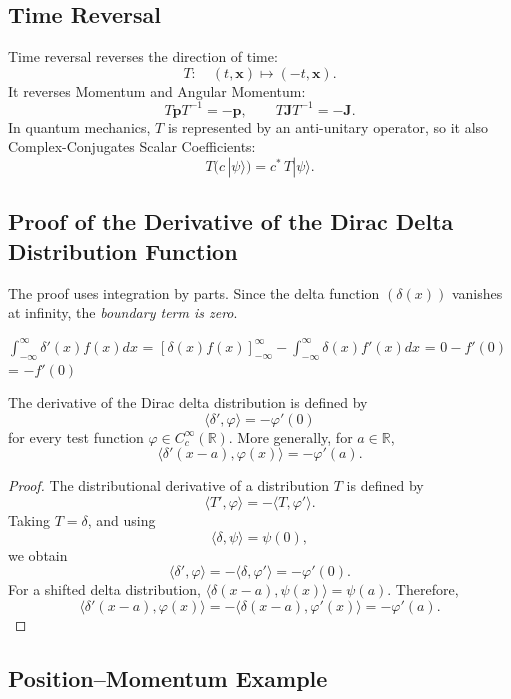 \documentclass[a4paper, 10pt, onepage]{elegantbook}
\begin{document}
{\subsection{Time Reversal}

Time reversal reverses the direction of time:
\[
T:\quad (t,\mathbf{x})\longmapsto(-t,\mathbf{x}).
\]
It reverses Momentum and Angular Momentum:
\[
T\mathbf{p}T^{-1}=-\mathbf{p},
\qquad
T\mathbf{J}T^{-1}=-\mathbf{J}.
\]
In quantum mechanics, \(T\) is represented by an anti-unitary operator, so it also Complex-Conjugates Scalar 
Coefficients:
\[
T\bigl(c\,|\psi\rangle\bigr)
=c^*\,T|\psi\rangle.
\]

\subsection{Proof of the Derivative of the Dirac Delta Distribution Function}

The proof uses integration by parts. Since the delta function $(\delta(x))$ vanishes at infinity, 
the \emph{boundary term is zero}.  

$\int_{-\infty}^{\infty} \delta'(x) f(x) dx$ = $\left[ \delta(x) f(x) \right]_{-\infty}^{\infty} 
- \int_{-\infty}^{\infty} \delta(x) f'(x) dx$ = $0 - f'(0)$ = $-f'(0)$  

\begin{theorem}
The derivative of the Dirac delta distribution is defined by
\[
\langle \delta',\varphi\rangle=-\varphi'(0)
\]
for every test function \(\varphi\in C_c^\infty(\mathbb{R})\).
More generally, for \(a\in\mathbb{R}\),
\[
\langle \delta'(x-a),\varphi(x)\rangle=-\varphi'(a).
\]
\end{theorem}

\begin{proof}
The distributional derivative of a distribution \(T\) is defined by
\[
\langle T',\varphi\rangle=-\langle T,\varphi'\rangle.
\]
Taking \(T=\delta\), and using
\[
\langle \delta,\psi\rangle=\psi(0),
\]
we obtain
\[
\langle \delta',\varphi\rangle
=-\langle \delta,\varphi'\rangle
=-\varphi'(0).
\]
For a shifted delta distribution, \(\langle \delta(x-a),\psi(x)\rangle
=\psi(a)\). Therefore,
\[
\langle \delta'(x-a),\varphi(x)\rangle
=-\langle \delta(x-a),\varphi'(x)\rangle
=-\varphi'(a).
\]
\end{proof}



\subsection{Position--Momentum Example}

}
\end{document}
